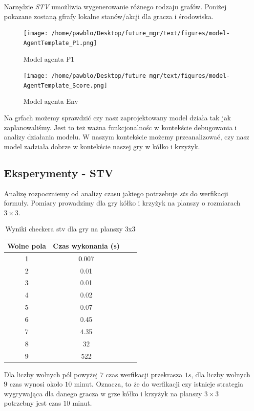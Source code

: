 Narzędzie \textit{STV} umożliwia wygenerowanie różnego rodzaju grafów. Poniżej pokazane zostaną 
gfrafy lokalne stanów/akcji dla gracza i środowiska.
\begin{figure}[h]
  \centering
  \texttt{[image: /home/pawblo/Desktop/future\_mgr/text/figures/model-AgentTemplate\_P1.png]}
  \caption{Model agenta P1}
  \label{fig:enter-label}
\end{figure}

\begin{figure}[h]
  \centering
  \texttt{[image: /home/pawblo/Desktop/future\_mgr/text/figures/model-AgentTemplate\_Score.png]}
  \caption{Model agenta Env}
  \label{fig:enter-label}
\end{figure}


Na grfach możemy sprawdzić czy nasz zaprojektowany model działa tak jak zaplanowaliśmy. Jest to też ważna
funkcjonalnośc w kontekście debugowania i analizy działania modelu. W naszym kontekście możemy przeanalizować, 
czy nasz model zadziała dobrze w kontekście naszej gry w kółko i krzyżyk.



\subsection*{Eksperymenty - STV}
Analizę rozpoczniemy od analizy czasu jakiego potrzebuje \textit{stv} do werfikacji formuły. Pomiary prowadzimy dla gry kółko i krzyżyk 
na planszy o rozmiarach $3 \times 3$.
\begin{table}[h!]
  \centering
  \begin{tabular}{|c|c|c|c|}
  \hline
  Wolne pola & Czas wykonania (s)  \\
  \hline
  1 & 0.007 \\
  2 & 0.01 \\
  3 & 0.01 \\
  4 & 0.02 \\
  5 & 0.07 \\
  6 & 0.45 \\
  7 & 4.35 \\
  8 & 32 \\
  9 & 522\\
  \hline
  \end{tabular}
  \caption{Wyniki checkera stv dla gry na planszy 3x3}
  \label{table:mcmas_results}
  \end{table}
  Dla liczby wolnych pól powyżej $7$ czas werfikacji przekrasza $1s$, dla liczby wolnych $9$ czas wynosi około $10$ minut. Oznacza, to że do werfikacji czy istnieje strategia 
  wygrywająca dla danego gracza w grze kółko i krzyżyk na planszy $3 \times 3$ potrzebny jest czas $10$ minut. 





